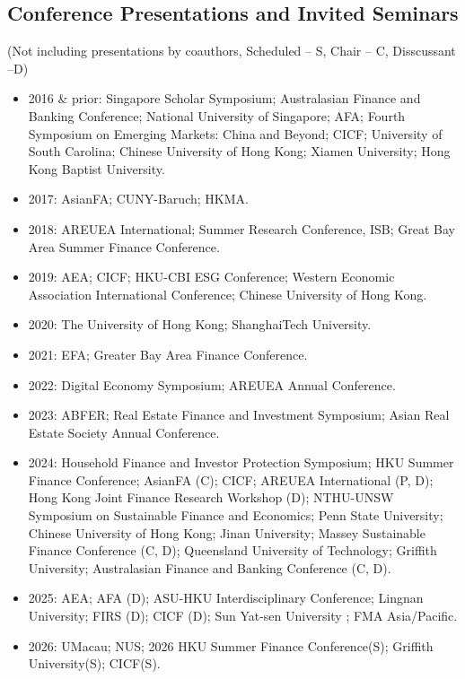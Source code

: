 \documentclass[11pt]{article}
\begin{document}
\subsection{Conference Presentations and Invited Seminars}
(Not including presentations by coauthors, Scheduled – S, Chair – C, Disscussant –D)
\begin{itemize}
\item 2016 \& prior: Singapore Scholar Symposium; Australasian Finance and Banking Conference; National University of Singapore; AFA; Fourth Symposium on Emerging Markets: China and Beyond; CICF; University of South Carolina; Chinese University of Hong Kong; Xiamen University; Hong Kong Baptist University.
\item 2017: AsianFA; CUNY-Baruch; HKMA.
\item 2018: AREUEA International; Summer Research Conference, ISB; Great Bay Area Summer Finance Conference.
\item 2019: AEA; CICF; HKU-CBI ESG Conference; Western Economic Association International Conference; Chinese University of Hong Kong.
\item 2020: The University of Hong Kong; ShanghaiTech University.
\item 2021: EFA; Greater Bay Area Finance Conference.
\item 2022: Digital Economy Symposium; AREUEA Annual Conference.
\item 2023: ABFER; Real Estate Finance and Investment Symposium; Asian Real Estate Society Annual Conference.
\item 2024: Household Finance and Investor Protection Symposium; HKU Summer Finance Conference; AsianFA (C); CICF; AREUEA International (P, D); Hong Kong Joint Finance Research Workshop (D); NTHU-UNSW Symposium on Sustainable Finance and Economics; Penn State University; Chinese University of Hong Kong; Jinan University; Massey Sustainable Finance Conference (C, D); Queensland University of Technology; Griffith University; Australasian Finance and Banking Conference (C, D).
\item 2025: AEA; AFA (D); ASU-HKU Interdisciplinary Conference; Lingnan University; FIRS (D); CICF (D); Sun Yat-sen University ; FMA Asia/Pacific.
\item 2026: UMacau; NUS; 2026 HKU Summer Finance Conference(S); Griffith University(S); CICF(S).
\end{itemize}
\end{document}
